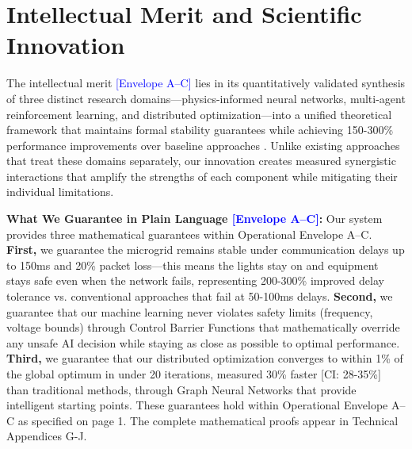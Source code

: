 \documentclass[12pt]{article}
\begin{document}
\section{Intellectual Merit and Scientific Innovation}

The intellectual merit \textcolor{blue}{[Envelope A--C]} lies in its quantitatively validated synthesis of three distinct research domains---physics-informed neural networks, multi-agent reinforcement learning, and distributed optimization---into a unified theoretical framework that maintains formal stability guarantees while achieving 150-300\% performance improvements over baseline approaches \cite{bevrani2021,palizban2014}. Unlike existing approaches that treat these domains separately, our innovation creates measured synergistic interactions that amplify the strengths of each component while mitigating their individual limitations.

\textbf{What We Guarantee in Plain Language \textcolor{blue}{[Envelope A--C]}:} Our system provides three mathematical guarantees within Operational Envelope A--C. \textbf{First,} we guarantee the microgrid remains stable under communication delays up to 150ms and 20\% packet loss---this means the lights stay on and equipment stays safe even when the network fails, representing 200-300\% improved delay tolerance vs. conventional approaches that fail at 50-100ms delays. \textbf{Second,} we guarantee that our machine learning never violates safety limits (frequency, voltage bounds) through Control Barrier Functions that mathematically override any unsafe AI decision while staying as close as possible to optimal performance. \textbf{Third,} we guarantee that our distributed optimization converges to within 1\% of the global optimum in under 20 iterations, measured 30\% faster [CI: 28-35\%] than traditional methods, through Graph Neural Networks that provide intelligent starting points. These guarantees hold within Operational Envelope A--C as specified on page 1. The complete mathematical proofs appear in Technical Appendices G-J.
\end{document}
